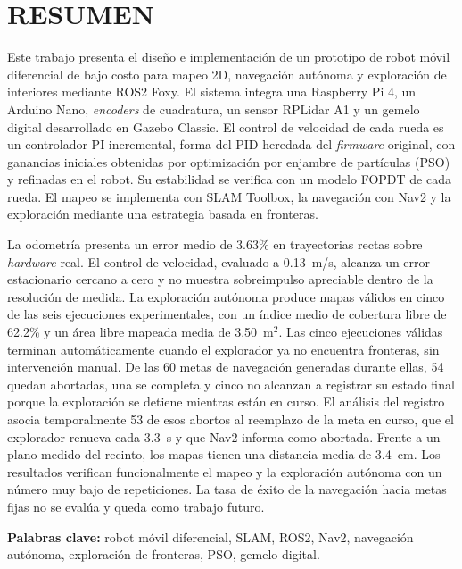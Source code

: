 \chapter*{RESUMEN}
\thispagestyle{fancy}
{}

Este trabajo presenta el diseño e implementación de un prototipo de robot móvil diferencial de bajo costo para mapeo 2D, navegación autónoma y exploración de interiores mediante \gls{ROS2} Foxy. El sistema integra una Raspberry Pi 4, un \gls{Arduino} Nano, \textit{encoders} de cuadratura, un sensor RPLidar A1 y un gemelo digital desarrollado en Gazebo Classic. El control de velocidad de cada rueda es un controlador PI incremental, forma del PID heredada del \textit{firmware} original, con ganancias iniciales obtenidas por optimización por enjambre de partículas (PSO) y refinadas en el robot. Su estabilidad se verifica con un modelo FOPDT de cada rueda. El mapeo se implementa con SLAM Toolbox, la navegación con Nav2 y la exploración mediante una estrategia basada en fronteras.

La odometría presenta un error medio de 3.63\% en trayectorias rectas sobre \textit{hardware} real. El control de velocidad, evaluado a 0.13~m/s, alcanza un error estacionario cercano a cero y no muestra sobreimpulso apreciable dentro de la resolución de medida. La exploración autónoma produce mapas válidos en cinco de las seis ejecuciones experimentales, con un índice medio de cobertura libre de 62.2\% y un área libre mapeada media de 3.50~m$^2$. Las cinco ejecuciones válidas terminan automáticamente cuando el explorador ya no encuentra fronteras, sin intervención manual. De las 60 metas de navegación generadas durante ellas, 54 quedan abortadas, una se completa y cinco no alcanzan a registrar su estado final porque la exploración se detiene mientras están en curso. El análisis del registro asocia temporalmente 53 de esos abortos al reemplazo de la meta en curso, que el explorador renueva cada 3.3~s y que Nav2 informa como abortada. Frente a un plano medido del recinto, los mapas tienen una distancia media de 3.4~cm. Los resultados verifican funcionalmente el mapeo y la exploración autónoma con un número muy bajo de repeticiones. La tasa de éxito de la navegación hacia metas fijas no se evalúa y queda como trabajo futuro.

\noindent\textbf{Palabras clave:} robot móvil diferencial, SLAM, \gls{ROS2}, Nav2, navegación autónoma, exploración de fronteras, PSO, gemelo digital.

